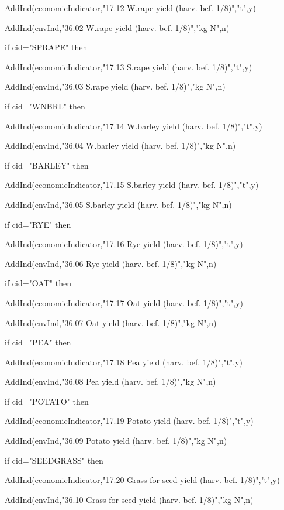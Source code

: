 \documentclass[%
]{scrartcl}
\begin{document}
{{{   	\quad AddInd(economicIndicator,"17.12 W.rape yield (harv. bef. 1/8)","t",y)
   	
 \quad AddInd(envInd,"36.02 W.rape yield (harv. bef. 1/8)","kg N",n)
   
   if cid="SPRAPE" then 
	
   \quad 	AddInd(economicIndicator,"17.13 S.rape yield (harv. bef. 1/8)","t",y)
   	 
\quad AddInd(envInd,"36.03 S.rape yield (harv. bef. 1/8)","kg N",n)
  
   if cid="WNBRL" then 
	
   \quad 	AddInd(economicIndicator,"17.14 W.barley yield (harv. bef. 1/8)","t",y)
   	
 \quad AddInd(envInd,"36.04 W.barley yield (harv. bef. 1/8)","kg N",n)
 
   if cid="BARLEY" then 
	
   \quad 	AddInd(economicIndicator,"17.15 S.barley yield (harv. bef. 1/8)","t",y)
   	
 \quad AddInd(envInd,"36.05 S.barley yield (harv. bef. 1/8)","kg N",n)
  
   if cid="RYE" then 
	
    \quad   AddInd(economicIndicator,"17.16 Rye yield (harv. bef. 1/8)","t",y)
	   
\quad AddInd(envInd,"36.06 Rye yield (harv. bef. 1/8)","kg N",n)
   
   if cid="OAT" then 
   
   \quad 	AddInd(economicIndicator,"17.17 Oat yield (harv. bef. 1/8)","t",y)
   	
 \quad AddInd(envInd,"36.07 Oat yield (harv. bef. 1/8)","kg N",n)
   
   if cid="PEA" then 

   \quad 	AddInd(economicIndicator,"17.18 Pea yield (harv. bef. 1/8)","t",y)
   	
 \quad AddInd(envInd,"36.08 Pea yield (harv. bef. 1/8)","kg N",n)
  
   if cid="POTATO" then 
	
  \quad  	AddInd(economicIndicator,"17.19 Potato yield (harv. bef. 1/8)","t",y)
   	
 \quad AddInd(envInd,"36.09 Potato yield (harv. bef. 1/8)","kg N",n)
  
   if cid="SEEDGRASS" then 
	
   \quad 	AddInd(economicIndicator,"17.20 Grass for seed yield (harv. bef. 1/8)","t",y)
   	
 \quad AddInd(envInd,"36.10 Grass for seed yield (harv. bef. 1/8)","kg N",n)
  
}}}
\end{document}
